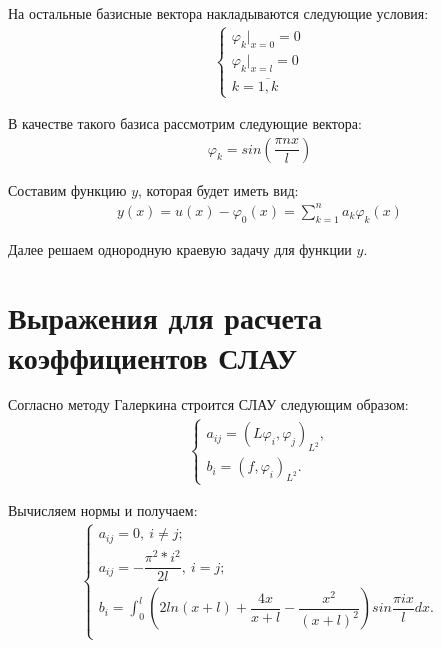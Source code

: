 \documentclass[12pt,a4paper,oneside]{extarticle}
\begin{document}
    На остальные базисные вектора накладываются следующие условия:
    \begin{gather}
        \begin{cases}
            \varphi_k|_{x = 0} = 0 \nonumber \\
            \varphi_k|_{x = l} = 0 \nonumber \\
            k = \overline{1, k} \nonumber
        \end{cases}
    \end{gather}
    
    В качестве такого базиса рассмотрим следующие вектора:
    \begin{gather}
        \varphi_k = sin\left( \dfrac{\pi nx}{l} \right) \nonumber
    \end{gather}
    
    Составим функцию $y$, которая будет иметь вид: 
    \begin{gather}
        y(x) = u(x) - \varphi_0(x) = \sum\limits_{k=1}^{n} a_k\varphi_k(x) \nonumber
    \end{gather}

    Далее решаем однородную краевую задачу для функции $y$.

\section{Выражения для расчета коэффициентов СЛАУ}
    Согласно методу Галеркина строится СЛАУ следующим образом:
    \begin{gather}
        \begin{cases}
            a_{ij} = (L\varphi_i,\varphi_j)_{L^2}, \nonumber \\
            b_i = (f,\varphi_i)_{L^2}.
        \end{cases}
    \end{gather}

    Вычисляем нормы и получаем:
    \begin{gather}
        \begin{cases}
            a_{ij} = 0,~ i \neq j;  \nonumber \\
            a_{ij} = -\dfrac{\pi^2*i^2}{2l}, ~i=j;  \nonumber \\
            b_i = \int_0^l (2ln(x+l) + \dfrac{4x}{x+l} - \dfrac{x^2}{(x+l)^2}) sin\dfrac{\pi ix}{l} dx.  \nonumber \\
        \end{cases}
    \end{gather}
    
\end{document}

